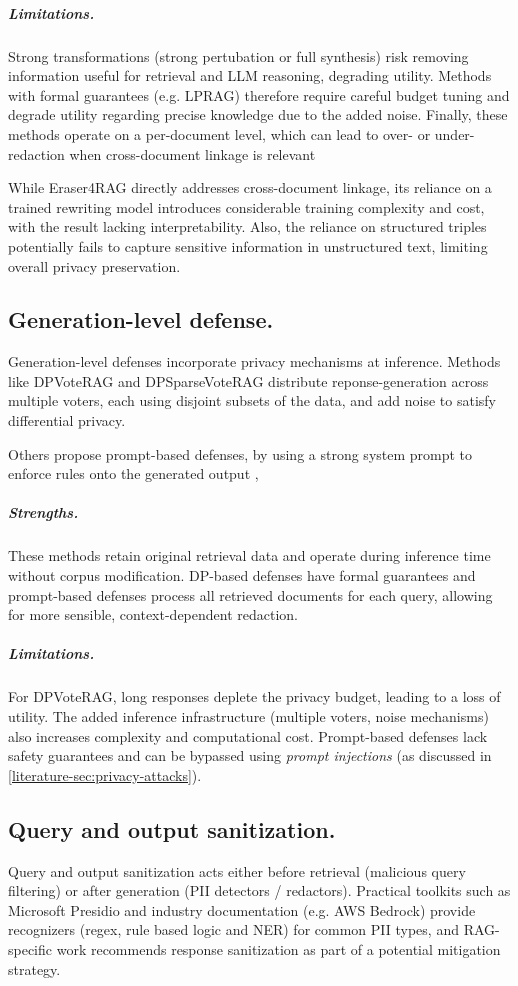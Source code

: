 \subparagraph{Limitations.} Strong transformations (strong pertubation or full synthesis) risk removing information useful for retrieval and LLM reasoning, degrading utility. Methods with formal guarantees (e.g. LPRAG) therefore require careful budget tuning and degrade utility regarding precise knowledge due to the added noise. Finally, these methods operate on a per-document level, which can lead to over- or under-redaction when cross-document linkage is relevant

While Eraser4RAG directly addresses cross-document linkage, its reliance on a trained rewriting model introduces considerable training complexity and cost, with the result lacking interpretability.
Also, the reliance on structured triples potentially fails to capture sensitive information in unstructured text, limiting overall privacy preservation. \cite{eraser4RAG}


\subsection{Generation-level defense.} Generation-level defenses incorporate privacy mechanisms at inference. Methods like DPVoteRAG and DPSparseVoteRAG distribute reponse-generation across multiple voters, each using disjoint subsets of the data, and add noise to satisfy differential privacy. \cite{DPVoteRAG} 

Others propose prompt-based defenses, by using a strong system prompt to enforce rules onto the generated output \cite{goodAndBad,anthropic_strengthen_guardrails,aws_secure_rag},

\subparagraph{Strengths.} These methods retain original retrieval data and operate during inference time without corpus modification. DP-based defenses have formal guarantees and prompt-based defenses process all retrieved documents for each query, allowing for more sensible, context-dependent redaction.

\subparagraph{Limitations.} For DPVoteRAG, long responses deplete the privacy budget, leading to a loss of utility. The added inference infrastructure (multiple voters, noise mechanisms) also increases complexity and computational cost. Prompt-based defenses lack safety guarantees and can be bypassed using \textit{prompt injections} (as discussed in \ref{literature-sec:privacy-attacks}). 


\subsection{Query and output sanitization.} Query and output sanitization acts either before retrieval (malicious query filtering) or after generation (\ac{PII} detectors / redactors). Practical toolkits such as Microsoft Presidio and industry documentation (e.g. AWS Bedrock) provide recognizers (regex, rule based logic and NER) for common \ac{PII} types, and RAG-specific work recommends response sanitization as part of a potential mitigation strategy. \cite{microsoft_presidio,aws_bedrock_privacy,ragThief}

